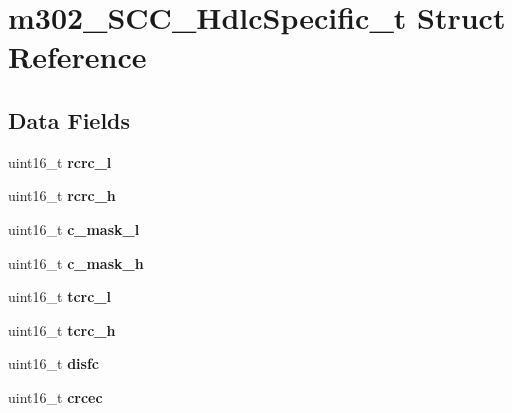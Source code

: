 \hypertarget{structm302__SCC__HdlcSpecific__t}{}\section{m302\+\_\+\+S\+C\+C\+\_\+\+Hdlc\+Specific\+\_\+t Struct Reference}
\label{structm302__SCC__HdlcSpecific__t}
\subsection*{Data Fields}
\begin{DoxyCompactItemize}
\item 
\mbox{\label{structm302__SCC__HdlcSpecific__t_ad9b2b773fd0ecbbcc097b40c16147238}} 
uint16\+\_\+t {\bfseries rcrc\+\_\+l}
\item 
\mbox{\label{structm302__SCC__HdlcSpecific__t_a82fc010ac53120529b6a4d3be0e76cf8}} 
uint16\+\_\+t {\bfseries rcrc\+\_\+h}
\item 
\mbox{\label{structm302__SCC__HdlcSpecific__t_a106d2cb88f4c710b463ab03251d17ea9}} 
uint16\+\_\+t {\bfseries c\+\_\+mask\+\_\+l}
\item 
\mbox{\label{structm302__SCC__HdlcSpecific__t_a3e18f77e12b8102c3abb67b0735220c3}} 
uint16\+\_\+t {\bfseries c\+\_\+mask\+\_\+h}
\item 
\mbox{\label{structm302__SCC__HdlcSpecific__t_a1238a60aa60b71a2934a31e3ca864c75}} 
uint16\+\_\+t {\bfseries tcrc\+\_\+l}
\item 
\mbox{\label{structm302__SCC__HdlcSpecific__t_ab7288760f2f923c03512f266bca2d8a3}} 
uint16\+\_\+t {\bfseries tcrc\+\_\+h}
\item 
\mbox{\label{structm302__SCC__HdlcSpecific__t_ad42a5176838c67f29ab3d5ee037279bf}} 
uint16\+\_\+t {\bfseries disfc}
\item 
\mbox{\label{structm302__SCC__HdlcSpecific__t_ac6cdc0a198dc221d31e5eea6cfe37ada}} 
uint16\+\_\+t {\bfseries crcec}

\end{DoxyCompactItemize}
